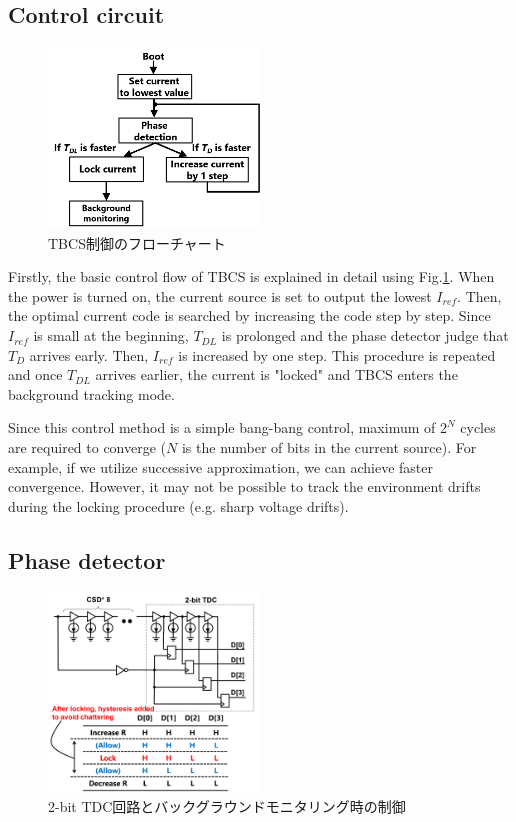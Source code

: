 \documentclass[letterpaper, 10 pt, conference]{ieeeconf}  %
\begin{document}
\subsection{Control circuit}
\begin{figure}[!]
\centering
 \includegraphics[width=0.5\textwidth]{figs/flowchart.png}
  \caption{TBCS制御のフローチャート}
\label{flow}
\end{figure}
Firstly, the basic control flow of TBCS is explained in detail using Fig.\ref{flow}. When the power is turned on, the current source is set to output the lowest $I_{ref}$. Then, the optimal current code is searched by increasing the code step by step. Since $I_{ref}$ is small at the beginning, $T_{DL}$ is prolonged and the phase detector judge that $T_D$ arrives early. Then, $I_{ref}$ is increased by one step. This procedure is repeated and once $T_{DL}$ arrives earlier, the current is "locked" and TBCS enters the background tracking mode.

Since this control method is a simple bang-bang control, maximum of $2^N$ cycles are required to converge ($N$ is the number of bits in the current source). For example, if we utilize successive approximation, we can achieve faster convergence. However, it may not be possible to track the environment drifts during the locking procedure (e.g. sharp voltage drifts).

\subsection{Phase detector}

\begin{figure}[!]
\centering
 \includegraphics[width=0.5\textwidth]{figs/tdc.png}
  \caption{2-bit TDC回路とバックグラウンドモニタリング時の制御}
\label{tdc}
\end{figure}
\end{document}
